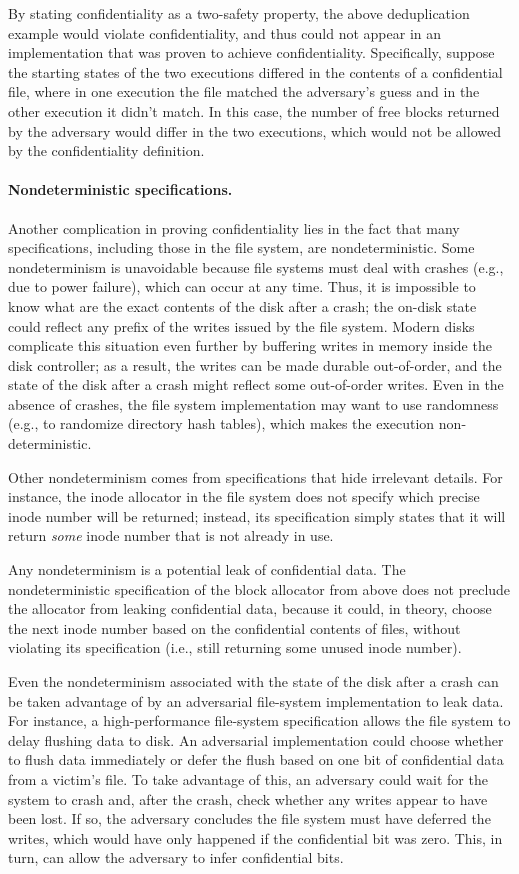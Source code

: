 By stating confidentiality as a two-safety property, the above
deduplication example would violate confidentiality, and thus could not
appear in an implementation that was proven to achieve confidentiality.
Specifically, suppose the starting states of the two executions differed
in the contents of a confidential file, where in one execution the file
matched the adversary's guess and in the other execution it didn't match.
In this case, the number of free blocks returned by the adversary
would differ in the two executions, which would not be allowed by the
confidentiality definition.

\paragraph{Nondeterministic specifications.}
Another complication in proving confidentiality lies in the fact
that many specifications, including those in the file system, are
nondeterministic.  Some nondeterminism is unavoidable because file
systems must deal with crashes (e.g., due to power failure), which can
occur at any time.  Thus, it is impossible to
know what are the exact contents of the disk after a crash; the on-disk
state could reflect any prefix of the writes issued by the file system.
Modern disks complicate this situation even further by buffering writes
in memory inside the disk controller; as a result, the writes can be
made durable out-of-order, and the state of the disk after a crash might
reflect some out-of-order writes.  Even in the absence of crashes, the
file system implementation may want to use randomness (e.g., to randomize
directory hash tables), which makes the execution non-deterministic.

Other nondeterminism comes from specifications that hide irrelevant
details.  For instance, the inode allocator in the file system does
not specify which precise inode number will be returned; instead,
its specification simply states that it will return
\emph{some} inode number that is not already in use.

Any nondeterminism is a potential leak of confidential data.  The
nondeterministic specification of the block allocator from above does not
preclude the allocator from leaking confidential data, because it could,
in theory, choose the next inode number based on the confidential contents
of files, without violating its specification (i.e., still returning some
unused inode number).

Even the nondeterminism associated with the state of the disk
after a crash can be taken advantage of by an adversarial file-system
implementation to leak data.  For instance, a high-performance
file-system specification allows the file system to delay flushing data
to disk.  An adversarial implementation could choose whether to flush
data immediately or defer the flush based on one bit of confidential
data from a victim's file.  To take advantage of this, an adversary
could wait for the system to crash and, after the crash, check whether
any writes appear to have been lost.  If so, the adversary concludes
the file system must have deferred the writes, which would have only
happened if the confidential bit was zero.  This, in turn, can allow
the adversary to infer confidential bits.

